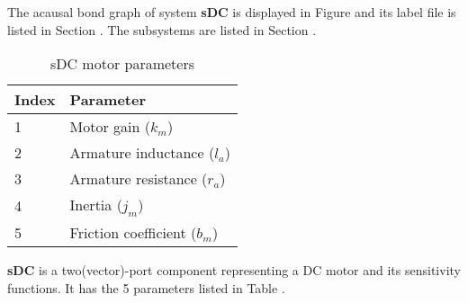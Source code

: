 

   The acausal bond graph of system \textbf{sDC} is
   displayed in Figure  and its label
   file is listed in Section .
   The subsystems are listed in Section .

   \begin{table}[htbp]
     \begin{center}
       \leavevmode
       \begin{tabular}{|l|l|}
        \hline
        Index & Parameter\\
        \hline
         1 & Motor gain ($k_m$) \\
         2 & Armature inductance ($l_a$) \\
         3 & Armature resistance ($r_a$) \\
         4 & Inertia ($j_m$) \\
         5 & Friction coefficient ($b_m$) \\
        \hline
       \end{tabular}
       \caption{sDC motor parameters}
       \label{tab:sDC_components}
     \end{center}
   \end{table}
{\bf sDC} is a two(vector)-port component representing a DC  motor and its
sensitivity functions. It has the 5
parameters listed in Table .


